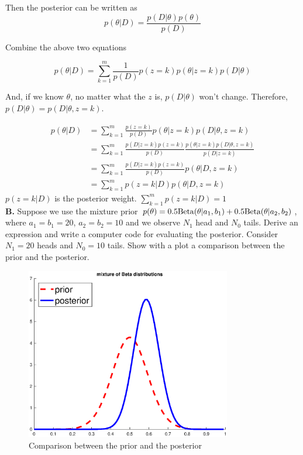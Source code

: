 \documentclass{article}
\newcommand{\widefigurewidth}{0.8\textwidth}
\begin{document}
Then the posterior can be written as 
\begin{equation}
p(\theta | D) = \frac{p(D | \theta)  p(\theta)}{p(D)}
\end{equation}

Combine the above two equations

\begin{equation}
p(\theta | D) =  \sum_{k=1}^m \frac{1}{p(D)} p(z=k)p(\theta|z=k)p(D | \theta)
\end{equation}

And, if we know $\theta$, no matter what the $z$ is, $p(D | \theta)$ won't change. Therefore,
$p(D |\theta) = p(D |\theta, z=k)$.

\begin{equation}
\begin{aligned}
 p(\theta | D) & =  \sum_{k=1}^m \frac{p(z=k)}{p(D)} p(\theta|z=k)p(D |\theta, z=k) \\
 &  = \sum_{k=1}^m \frac{p(D | z = k) p(z=k)}{p(D)} \frac{p(\theta|z=k)p(D |\theta, z=k)}{p(D | z = k)}
 \\
& =  \sum_{k=1}^m \frac{p(D | z = k) p(z=k)}{p(D)} p(\theta | D, z = k) \\
& = \sum_{k=1}^m p(z = k | D) p(\theta | D, z = k)
\end{aligned}
\end{equation}
$p(z = k | D)$ is the posterior weight. $\sum_{k=1}^{m} p(z = k | D)= 1 $ 
\\
\textbf{B.} Suppose we use the mixture prior $p(\theta) = 0.5 {\rm Beta}(\theta|a_{1},b_{1})+0.5 {\rm Beta}(\theta|a_{2},b_{2})$, where $a_{1}=b_{1} = 20$, $a_{2}=b_{2} = 10$ and we observe $N_{1}$ head and $N_{0}$ tails. Derive an expression and write a computer code for evaluating the posterior. Consider $N_{1} = 20$ heads and $N_{0}=10$ tails. Show with a plot a comparison between the prior and the posterior.
\begin{figure}[h!]
\centering
\includegraphics[width=\widefigurewidth]{fig/P3b.eps}
\caption{Comparison between the prior and the posterior}
\end{figure}
\end{document}
